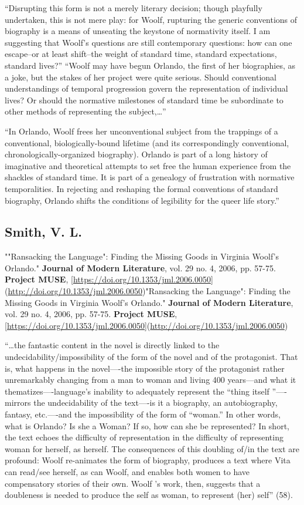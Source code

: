 \documentclass[11pt]{article}
\begin{document}
“Disrupting this form is not a merely literary decision; though
playfully undertaken, this is not mere play: for Woolf, rupturing the
generic conventions of biography is a means of unseating the keystone
of normativity itself. I am suggesting that Woolf's questions are
still contemporary questions: how can one escape--or at least
shift--the weight of standard time, standard expectations, standard
lives?” “Woolf may have begun Orlando, the first of her biographies,
as a joke, but the stakes of her project were quite serious. Should
conventional understandings of temporal progression govern the
representation of individual lives? Or should the normative milestones
of standard time be subordinate to other methods of representing the
subject,\ldots{}”

“In Orlando, Woolf frees her unconventional subject from the trappings
of a conventional, biologically-bound lifetime (and its
correspondingly conventional, chronologically-organized biography).
Orlando is part of a long history of imaginative and theoretical
attempts to set free the human experience from the shackles of
standard time. It is part of a genealogy of frustration with normative
temporalities. In rejecting and reshaping the formal conventions of
standard biography, Orlando shifts the conditions of legibility for
the queer life story.”

\subsection{Smith, V. L.}
\label{sec:org41d9dfa}
""Ransacking the Language": Finding the Missing Goods in Virginia
Woolf's Orlando." \textbf{Journal of Modern Literature}, vol. 29 no. 4, 2006,
pp. 57-75. \textbf{Project MUSE},
[\url{https://doi.org/10.1353/jml.2006.0050}](\url{http://doi.org/10.1353/jml.2006.0050})"Ransacking the Language": Finding the Missing Goods in Virginia
Woolf's Orlando." \textbf{Journal of Modern Literature}, vol. 29 no. 4, 2006,
pp. 57-75. \textbf{Project MUSE},
[\url{https://doi.org/10.1353/jml.2006.0050}](\url{http://doi.org/10.1353/jml.2006.0050})

“\ldots{}the fantastic content in the novel is directly linked to the
undecidability/impossibility of the form of the novel and of the
protagonist. That is, what happens in the novel—-the impossible story
of the protagonist rather unremarkably changing from a man to woman
and living 400 years—and what it thematizes—-language’s inability to
adequately represent the “thing itself ”—-mirrors the undecidability
of the text—-is it a biography, an autobiography, fantasy, etc.—-and
the impossibility of the form of “woman.” In other words, what is
Orlando? Is she a Woman? If so, how can she be represented? In short,
the text echoes the difficulty of representation in the difficulty of
representing woman for herself, as herself. The consequences of this
doubling of/in the text are profound: Woolf re-animates the form of
biography, produces a text where Vita can read/see herself, as can
Woolf, and enables both women to have compensatory stories of their
own. Woolf ’s work, then, suggests that a doubleness is needed to
produce the self as woman, to represent (her) self” (58).
\end{document}

